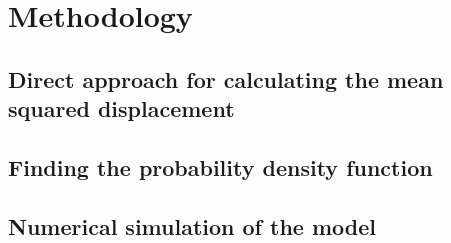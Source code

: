 \chapter{Methodology}



\section{Direct approach for calculating the mean squared displacement}

\section{Finding the probability density function}

\section{Numerical simulation of the model}